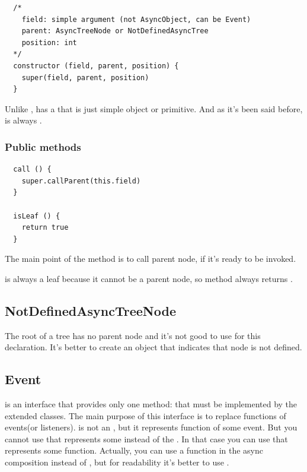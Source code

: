 \documentclass{article}
\begin{document}
\begin{verbatim}
  /*
    field: simple argument (not AsyncObject, can be Event)
    parent: AsyncTreeNode or NotDefinedAsyncTree
    position: int
  */
  constructor (field, parent, position) {
    super(field, parent, position)
  }
\end{verbatim}

Unlike ,  has a  that is just simple object or primitive. And as it's been said before,  is always .

\vspace*{10px}

\subsubsection{Public methods}

\begin{verbatim}
  call () {
    super.callParent(this.field)
  }

  isLeaf () {
    return true
  }
\end{verbatim}

The main point of the method  is to call parent node, if it's ready to be invoked.

 is always a leaf because it cannot be a parent node, so method  always returns .

\vspace*{10px}

\subsection{NotDefinedAsyncTreeNode}

The root of a tree has no parent node and it's not good to use  for this declaration. It's better to create an object that indicates that node is not defined.  

\subsection{Event}

 is an interface that provides only one method:  that must be implemented by the extended classes. The main purpose of this interface is to replace functions of events(or listeners).  is not an , but it represents function of some event. But you cannot use  that represents some  instead of the . In that case you can use  that represents some function. Actually, you can use a function in the async composition instead of , but for readability it's better to use .
\end{document}
